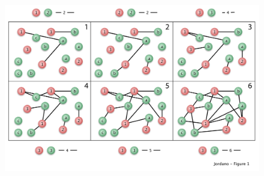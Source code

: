 \documentclass[12pt]{article}
\begin{document}
\newpage
\begin{figure}[h!]
  \caption{}
  \label{Fig2}
  \begin{center}
    \includegraphics[width=16cm]{../figures/Fig2.pdf}
  \end{center}
\end{figure}
\end{document}
